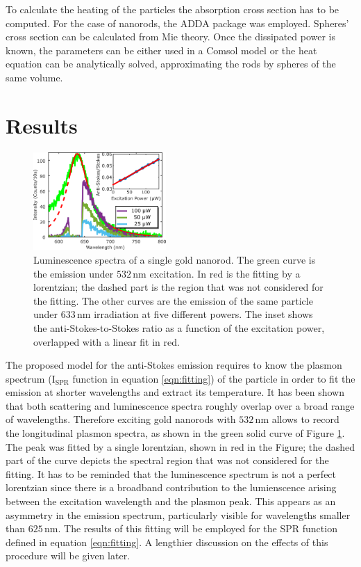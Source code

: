 \documentclass[journal=nalefd,manuscript=letter]{achemso}
\newcommand{\nm}{\ensuremath{\,\textrm{nm}}}
\begin{document}
To calculate the heating of the particles the absorption cross section has to be
computed. For the case of nanorods, the ADDA package was employed. Spheres'
cross section can be calculated from Mie theory. Once the dissipated power is
known, the parameters can be either used in a Comsol model or the
heat equation can be analytically solved, approximating the rods by spheres of
the same volume.

\section{Results}
\begin{figure}[htp] \centering
\includegraphics[width=0.45\textwidth]{Figures/02_Several_Intensities/02_several_intensities.png}
\caption{Luminescence spectra of a single gold nanorod. The green curve is the
emission under $532\nm$ excitation. In red is the fitting by a lorentzian; the
dashed part is the region that was not considered for the fitting. The other
curves are the emission of the same particle under $633\nm$ irradiation at five 
different powers. The inset shows the anti-Stokes-to-Stokes ratio as a function
of the excitation power, overlapped with a linear fit in red.}
	\label{fig:spectra_rod}
\end{figure}

The proposed model for the anti-Stokes emission requires to know the plasmon
spectrum ($\textrm{I}_{\textrm{SPR}}$ function in equation \ref{eqn:fitting}) of
the particle in order to fit the emission at shorter wavelengths and extract its
temperature. It has been shown that both scattering and luminescence spectra
roughly overlap over a broad range of wavelengths\cite{Yorulmaz2012}. Therefore
exciting gold nanorods with $532\nm$ allows to record the longitudinal plasmon
spectra, as shown in the green solid curve of Figure \ref{fig:spectra_rod}. The
peak was fitted by a single lorentzian, shown in red in the Figure; the dashed
part of the curve depicts the spectral region that was not considered for the
fitting. It has to be reminded that the luminescence spectrum is not a perfect
lorentzian since there is a broadband contribution to the lumienscence arising
between the excitation wavelength and the plasmon peak\cite{Boyd1986}. This
appears as an asymmetry in the emission spectrum, particularly visible for
wavelengths smaller than $625\nm$. The results of this fitting will be employed
for the SPR function defined in equation \ref{eqn:fitting}. A lengthier
discussion on the effects of this procedure will be given later.
\end{document}
